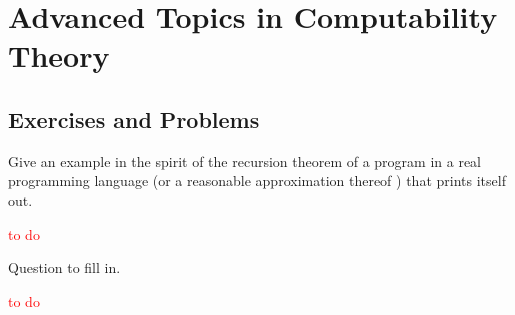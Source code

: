 \chapter{Advanced Topics in Computability Theory}

\section*{Exercises and Problems}

\begin{exercise}{6.1}
  Give an example in the spirit of the recursion theorem of a program in a real programming language (or a reasonable approximation thereof ) that prints itself out.
\end{exercise}

\textcolor{red}{to do}

\setcounter{exercise}{10}

\begin{exercise}{6.11}
  Question to fill in.
\end{exercise}

\textcolor{red}{to do}
